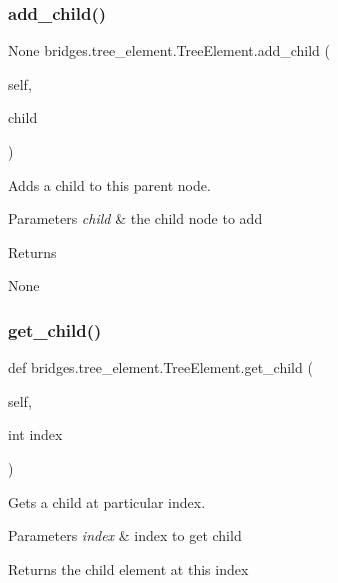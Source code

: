 \subsubsection{\texorpdfstring{add\_child()}{add\_child()}}
{\footnotesize\ttfamily  None bridges.\+tree\+\_\+element.\+Tree\+Element.\+add\+\_\+child (\begin{DoxyParamCaption}\item[{}]{self,  }\item[{}]{child }\end{DoxyParamCaption})}



Adds a child to this parent node. 


\begin{DoxyParams}{Parameters}
{\em child} & the child node to add \\
\hline
\end{DoxyParams}
\begin{DoxyReturn}{Returns}


None 
\end{DoxyReturn}
\mbox{\label{classbridges_1_1tree__element_1_1_tree_element_a333d920ece1c481b9063ca68401e425b}} 
\subsubsection{\texorpdfstring{get\_child()}{get\_child()}}
{\footnotesize\ttfamily def bridges.\+tree\+\_\+element.\+Tree\+Element.\+get\+\_\+child (\begin{DoxyParamCaption}\item[{}]{self,  }\item[{int}]{index }\end{DoxyParamCaption})}



Gets a child at particular index. 


\begin{DoxyParams}{Parameters}
{\em index} & index to get child \\
\hline
\end{DoxyParams}
\begin{DoxyReturn}{Returns}
the child element at this index
\end{DoxyReturn}

